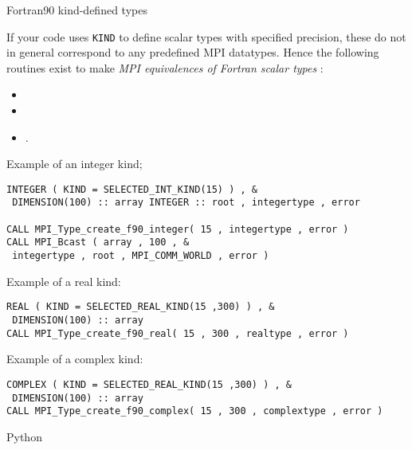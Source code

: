 

 {Fortran90 kind-defined types}
\label{sec:f90-types}

If your  code uses \lstinline{KIND} to define scalar types with
specified precision, these do not in general correspond to any
predefined MPI datatypes. Hence the following routines exist to make
\emph{MPI equivalences of Fortran scalar types}%
:
\begin{itemize}
\item
\item
\item
  .
\end{itemize}

Example of an integer kind;
\begin{lstlisting}
INTEGER ( KIND = SELECTED_INT_KIND(15) ) , &
 DIMENSION(100) :: array INTEGER :: root , integertype , error 

CALL MPI_Type_create_f90_integer( 15 , integertype , error )
CALL MPI_Bcast ( array , 100 , &
 integertype , root , MPI_COMM_WORLD , error )
\end{lstlisting}

Example of a real kind:
\begin{lstlisting}
REAL ( KIND = SELECTED_REAL_KIND(15 ,300) ) , &
 DIMENSION(100) :: array
CALL MPI_Type_create_f90_real( 15 , 300 , realtype , error )  
\end{lstlisting}

Example of a complex kind:
\begin{lstlisting}
COMPLEX ( KIND = SELECTED_REAL_KIND(15 ,300) ) , &
 DIMENSION(100) :: array 
CALL MPI_Type_create_f90_complex( 15 , 300 , complextype , error )
\end{lstlisting}

\lstset{style=reviewcode,language=C} %

 {Python}
\label{sec:py-elementary}

